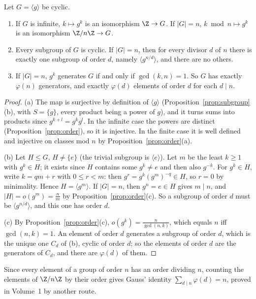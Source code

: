 \begin{theorem}\label{thm:cyclic}
Let $G=\langle g\rangle$ be cyclic.
\begin{enumerate}[label=(\alph*)]
\item If $G$ is infinite, $k\mapsto g^k$ is an isomorphism $\Z\to G$. If $|G|=n$, $k\bmod n\mapsto g^k$ is an isomorphism $\Z/n\Z\to G$.
\item Every subgroup of $G$ is cyclic. If $|G|=n$, then for every divisor $d$ of $n$ there is exactly one subgroup of order $d$, namely $\langle g^{n/d}\rangle$, and there are no others.
\item If $|G|=n$, $g^k$ generates $G$ if and only if $\gcd(k,n)=1$. So $G$ has exactly $\varphi(n)$ generators, and exactly $\varphi(d)$ elements of order $d$ for each $d\mid n$.
\end{enumerate}
\end{theorem}
\begin{proof}
(a) The map is surjective by definition of $\langle g\rangle$ (Proposition~\ref{prop:subgroup}(b), with $S=\{g\}$, every product being a power of $g$), and it turns sums into products since $g^{k+l}=g^kg^l$. In the infinite case the powers are distinct (Proposition~\ref{prop:order}), so it is injective. In the finite case it is well defined and injective on classes mod $n$ by Proposition~\ref{prop:order}(a).

(b) Let $H\le G$, $H\ne\{e\}$ (the trivial subgroup is $\langle e\rangle$). Let $m$ be the least $k\ge1$ with $g^k\in H$; it exists since $H$ contains some $g^k\ne e$ and then also $g^{-k}$. For $g^k\in H$, write $k=qm+r$ with $0\le r<m$: then $g^r=g^k(g^m)^{-q}\in H$, so $r=0$ by minimality. Hence $H=\langle g^m\rangle$. If $|G|=n$, then $g^n=e\in H$ gives $m\mid n$, and $|H|=o(g^m)=\frac nm$ by Proposition~\ref{prop:order}(c). So a subgroup of order $d$ must be $\langle g^{n/d}\rangle$, and this one has order $d$.

(c) By Proposition~\ref{prop:order}(c), $o(g^k)=\frac n{\gcd(n,k)}$, which equals $n$ iff $\gcd(n,k)=1$. An element of order $d$ generates a subgroup of order $d$, which is the unique one $C_d$ of (b), cyclic of order $d$; so the elements of order $d$ are the generators of $C_d$, and there are $\varphi(d)$ of them.
\end{proof}

Since every element of a group of order $n$ has an order dividing $n$, counting the elements of $\Z/n\Z$ by their order gives Gauss' identity $\sum_{d\mid n}\varphi(d)=n$, proved in Volume~1 by another route.

